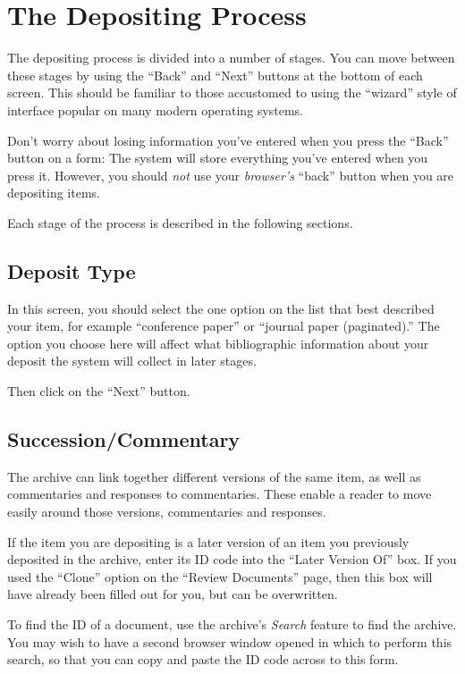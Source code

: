 \section{The Depositing Process}


The depositing process is divided into a number of stages. You can move between these stages by using the ``Back'' and ``Next'' buttons at the bottom of each screen. This should be familiar to those accustomed to using the ``wizard'' style of interface popular on many modern operating systems.

Don't worry about losing information you've entered when you press the ``Back'' button on a form: The system will store everything you've entered when you press it. However, you should \emph{not} use your \emph{browser's} ``back'' button when you are depositing items.

Each stage of the process is described in the following sections.


\subsection{Deposit Type}

In this screen, you should select the one option on the list that best described your item, for example ``conference paper'' or ``journal paper (paginated).'' The option you choose here will affect what bibliographic information about your deposit the system will collect in later stages.

Then click on the ``Next'' button.


\subsection{Succession/Commentary}

The archive can link together different versions of the same item, as well as commentaries and responses to commentaries. These enable a reader to move easily around those versions, commentaries and responses.

If the item you are depositing is a later version of an item you previously deposited in the archive, enter its ID code into the ``Later Version Of'' box. If you used the ``Clone'' option on the ``Review Documents'' page, then this box will have already been filled out for you, but can be overwritten.

To find the ID of a document, use the archive's \emph{Search} feature to find the archive. You may wish to have a second browser window opened in which to perform this search, so that you can copy and paste the ID code across to this form.

